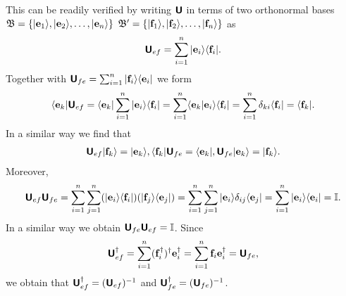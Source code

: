 This can be readily verified \cite{Schwinger.60} by writing $\textsf{\textbf{U}}$
in terms of two orthonormal bases
${\frak B}=\{\vert {\bf e}_1\rangle , \vert  {\bf e}_2\rangle , \ldots , \vert {\bf e}_n\rangle \}$
${\frak B}'= \{\vert {\bf f}_1\rangle , \vert  {\bf f}_2\rangle , \ldots , \vert {\bf f}_n\rangle \}$ as
\begin{equation}
\textsf{\textbf{U}}_{ef}
= \sum_{i=1}^n  \vert {\bf e}_i\rangle \langle {\bf f}_i \vert
.
\label{2016-m-ch-citoob-sinobv}
\end{equation}
Together with $\textsf{\textbf{U}}_{fe}=   \sum_{i=1}^n  \vert {\bf f}_i\rangle \langle {\bf e}_i \vert $
we form
\begin{equation}
\begin{split}
\langle {\bf e}_k \vert \textsf{\textbf{U}}_{ef}  = \langle {\bf e}_k \vert \sum_{i=1}^n  \vert {\bf e}_i \rangle \langle {\bf f}_i \vert
= \sum_{i=1}^n  \langle {\bf e}_k \vert {\bf e}_i\rangle  \langle {\bf f}_i \vert
= \sum_{i=1}^n  \delta_{ki} \langle {\bf f}_i \vert  =  \langle {\bf f}_k \vert
.
\end{split}
\end{equation}
In a similar way we find that
\begin{equation}
\begin{split}
\textsf{\textbf{U}}_{ef} \vert {\bf f}_k \rangle = \vert {\bf e}_k \rangle,
\langle {\bf f}_k \vert \textsf{\textbf{U}}_{fe}   =  \langle {\bf e}_k\vert ,
\textsf{\textbf{U}}_{fe}\vert {\bf e}_k \rangle  = \vert {\bf f}_k \rangle .
\end{split}
\end{equation}
Moreover,
\begin{equation}
\begin{split}
\textsf{\textbf{U}}_{ef}\textsf{\textbf{U}}_{fe}
=
 \sum_{i=1}^n  \sum_{j=1}^n
(\vert {\bf e}_i\rangle \langle {\bf f}_i \vert )
(\vert {\bf f}_j\rangle \langle {\bf e}_j \vert )
=
 \sum_{i=1}^n  \sum_{j=1}^n
\vert {\bf e}_i\rangle \delta_{ij} \langle {\bf e}_j \vert
=
 \sum_{i=1}^n
\vert {\bf e}_i\rangle   \langle {\bf e}_i \vert
=
{\Bbb I}
.
\end{split}
\end{equation}
In a similar way we obtain
$\textsf{\textbf{U}}_{fe}\textsf{\textbf{U}}_{ef}=
{\Bbb I}$.
Since
\begin{equation}
\textsf{\textbf{U}}_{ef}^\dagger = \sum_{i=1}^n  ( {\bf f}_i^\dagger )^\dagger {\bf e}_i^\dagger
= \sum_{i=1}^n  {\bf f}_i {\bf e}_i^\dagger
= \textsf{\textbf{U}}_{fe},
\end{equation}
we obtain that $\textsf{\textbf{U}}_{ef}^\dagger = (\textsf{\textbf{U}}_{ef})^{-1}$
and $\textsf{\textbf{U}}_{fe}^\dagger = (\textsf{\textbf{U}}_{fe})^{-1}$.

